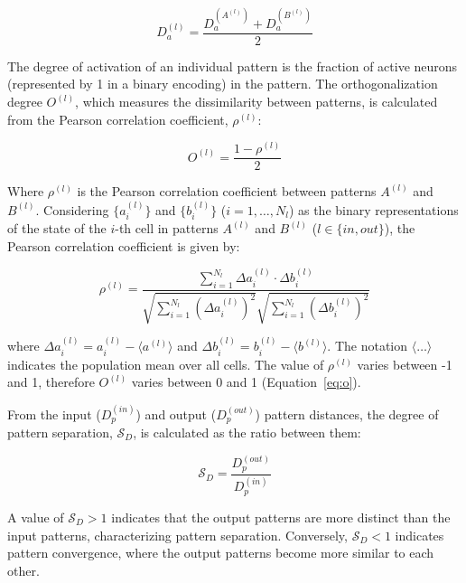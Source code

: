 \begin{equation}
    \label{eq:da}
    D_a^{(l)} = \frac{D_a^{(A^{(l)})} + D_a^{(B^{(l)})}}{2}
\end{equation}

The degree of activation of an individual pattern is the fraction of active neurons (represented by 1 in a binary encoding) in
the pattern. The orthogonalization degree $O^{(l)}$, which measures the dissimilarity between patterns, is calculated from the
Pearson correlation coefficient, $\rho^{(l)}$:

\begin{equation}
    \label{eq:o}
    O^{(l)} = \frac{1 - \rho^{(l)}}{2}
\end{equation}

Where $\rho^{(l)}$ is the Pearson correlation coefficient between patterns $A^{(l)}$ and $B^{(l)}$.
Considering $\{a_i^{(l)}\}$ and $\{b_i^{(l)}\}$ ($i=1, \dots, N_l$) as the binary representations of the state of the
$i$-th cell in patterns $A^{(l)}$ and $B^{(l)}$ ($l \in \{in, out\}$), the Pearson correlation coefficient is given by:

\begin{equation}
    \label{eq:pearson}
    \rho^{(l)} = \frac{\sum_{i=1}^{N_l} \Delta a_i^{(l)} \cdot \Delta b_i^{(l)}}{\sqrt{\sum_{i=1}^{N_l} {(\Delta a_i^{(l)})}^2} \sqrt{\sum_{i=1}^{N_l} {(\Delta b_i^{(l)})}^2}}
\end{equation}

where $\Delta a_i^{(l)} = a_i^{(l)} - \langle a^{(l)} \rangle$ and $\Delta b_i^{(l)} = b_i^{(l)} - \langle b^{(l)} \rangle$.
The notation $\langle \dots \rangle$ indicates the population mean over all cells. The value of $\rho^{(l)}$ varies between
-1 and 1, therefore $O^{(l)}$ varies between 0 and 1 (Equation~\ref{eq:o}).

From the input ($D_p^{(in)}$) and output ($D_p^{(out)}$) pattern distances, the degree of pattern separation,
$\mathcal{S}_D$, is calculated as the ratio between them:

\begin{equation}
    \label{eq:sd}
    \mathcal{S}_D = \frac{D_p^{(out)}}{D_p^{(in)}}
\end{equation}

A value of $\mathcal{S}_D > 1$ indicates that the output patterns are more distinct than the input patterns, characterizing
pattern separation. Conversely, $\mathcal{S}_D < 1$ indicates pattern convergence, where the output patterns become more
similar to each other.

